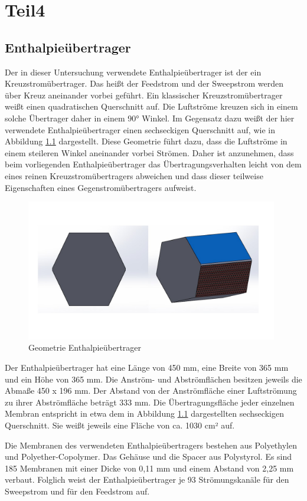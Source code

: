\chapter{Teil4}
\label{cha:Enthalpieübertrager}


\section{Enthalpieübertrager}
\label{sec:Enthalpieübertrager}

Der in dieser Untersuchung verwendete Enthalpieübertrager ist der ein Kreuzstromübertrager. Das heißt der Feedstrom und der Sweepstrom werden über Kreuz aneinander vorbei geführt. Ein klassischer Kreuzstromübertrager weißt einen quadratischen Querschnitt auf. Die Luftströme kreuzen sich in einem solche Übertrager daher in einem 90° Winkel. Im Gegensatz dazu weißt der hier verwendete Enthalpieübertrager einen sechseckigen Querschnitt auf, wie in Abbildung \ref{Geometrie Enthalpieuebertrager} dargestellt. Diese Geometrie führt dazu, dass die Luftströme in einem steileren Winkel aneinander vorbei Strömen. Daher ist anzunehmen, dass beim vorliegenden Enthalpieübertrager das Übertragungsverhalten leicht von dem eines reinen Kreuzstromübertragers abweichen und dass dieser teilweise Eigenschaften eines Gegenstromübertragers aufweist. 

\begin{figure} [h]
	\centering
	\includegraphics[width=0.98\textwidth]{pictures/Geometrie_Enthalpieuebertrager.jpg}
	\caption{Geometrie Enthalpieübertrager}
	\label{Geometrie Enthalpieuebertrager}
\end{figure}

Der Enthalpieübertrager hat eine Länge von 450 mm, eine Breite von 365 mm und ein Höhe von 365 mm. Die Anström- und Abströmflächen besitzen jeweils die Abmaße 450 x 196 mm. Der Abstand von der Anströmfläche einer Luftströmung zu ihrer Abströmfläche beträgt 333 mm. Die Übertragungsfläche jeder einzelnen Membran entspricht in etwa dem in Abbildung \ref{Geometrie Enthalpieuebertrager} dargestellten sechseckigen Querschnitt. Sie weißt jeweils eine Fläche von ca. 1030 cm² auf.   

Die Membranen des verwendeten Enthalpieübertragers bestehen aus Polyethylen und Polyether-Copolymer. Das Gehäuse und die Spacer aus Polystyrol. Es sind 185 Membranen mit einer Dicke von 0,11 mm und einem Abstand von 2,25 mm verbaut. Folglich weist der Enthalpieübertrager je 93 Strömungskanäle für den Sweepstrom und für den Feedstrom auf. 
 
 